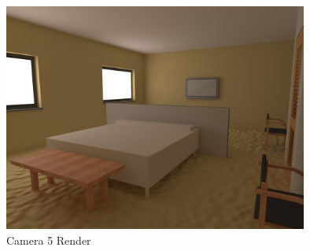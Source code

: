 \begin{figure}[hb]
	\centering
	\includegraphics[width=10cm]{img/HotelRoomCamera1.jpg}
	\caption{Camera 5 Render}
	\label{fig:Cam5]}
\end{figure}


\\




